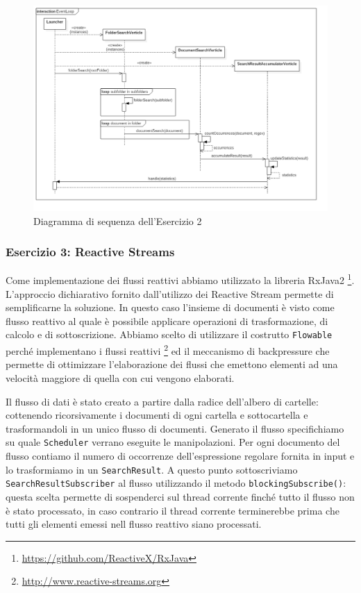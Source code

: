 \documentclass[a4paper]{article}
\begin{document}
\begin{figure}[H]

    \centering

    \includegraphics[width=\linewidth, height=\textheight,keepaspectratio]{EventLoop}

    \caption{Diagramma di sequenza dell'Esercizio 2}

    \label{fig:event-loop}

\end{figure}

\subsubsection{Esercizio 3: Reactive Streams}

Come implementazione dei flussi reattivi abbiamo utilizzato la libreria RxJava2 \footnote{\url{https://github.com/ReactiveX/RxJava}}.
%
L'approccio dichiarativo fornito dall'utilizzo dei Reactive Stream permette di semplificarne la soluzione.
%
In questo caso l'insieme di documenti \`e visto come flusso reattivo al quale \`e possibile applicare operazioni di trasformazione, di calcolo e di sottoscrizione.
%
Abbiamo scelto di utilizzare il costrutto \texttt{Flowable} perch\'e implementano i flussi reattivi \footnote{\url{http://www.reactive-streams.org}} ed il meccanismo di backpressure che permette di ottimizzare l'elaborazione dei flussi che emettono elementi ad una velocit\`a maggiore di quella con cui vengono elaborati.

Il flusso di dati \`e stato creato a partire dalla radice dell'albero di cartelle: cottenendo ricorsivamente i documenti di ogni cartella e sottocartella e trasformandoli in un unico flusso di documenti.
%
Generato il flusso specifichiamo su quale \texttt{Scheduler} verrano eseguite le manipolazioni.
%
Per ogni documento del flusso contiamo il numero di occorrenze dell'espressione regolare fornita in input e lo trasformiamo in un \texttt{SearchResult}.
%
A questo punto sottoscriviamo \texttt{SearchResultSubscriber} al flusso utilizzando il metodo \texttt{blockingSubscribe()}: questa scelta permette di sospenderci sul thread corrente finch\'e tutto il flusso non \`e stato processato, in caso contrario il thread corrente terminerebbe prima che tutti gli elementi emessi nell flusso reattivo siano processati.
\end{document}
